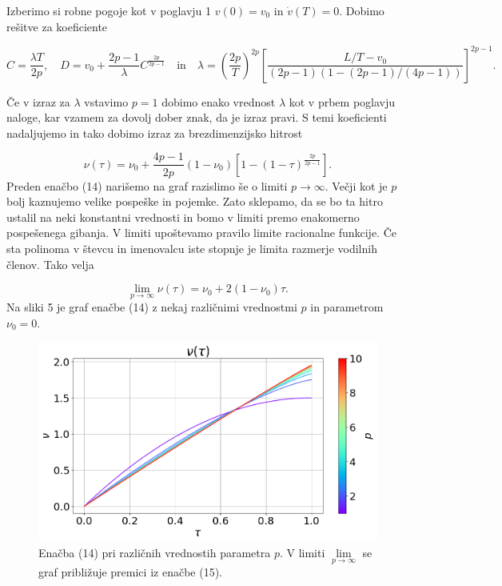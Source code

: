 \documentclass[slovene,11pt,a4paper]{article}
\begin{document}
Izberimo si robne pogoje kot v poglavju 1 $v(0) = v_0$ in $\dot{v}(T) = 0$. Dobimo rešitve za koeficiente

\[
C = \frac{\lambda T}{2p}, \quad
D = v_0 + \frac{2p-1}{\lambda} C^{\frac{2p}{2p-1}} \quad \text{in} \quad
\lambda = \left( \frac{2p}{T} \right)^{2p} \left[\frac{L/T - v_0}{(2p-1) (1-(2p-1)/(4p-1))}\right]^{2p-1}.
\]

Če v izraz za $\lambda$ vstavimo $p=1$ dobimo enako vrednost $\lambda$ kot v prbem poglavju naloge, kar vzamem za dovolj dober znak, da je izraz pravi. S temi koeficienti nadaljujemo in tako dobimo izraz za brezdimenzijsko hitrost

\begin{equation}
\nu(\tau) = \nu_0 + \frac{4p-1}{2p}(1-\nu_0)\left[1-(1-\tau)^{\frac{2p}{2p-1}}\right].
\end{equation}
Preden enačbo (14) narišemo na graf razislimo še o limiti $p\rightarrow \infty$. Večji kot je $p$ bolj kaznujemo velike pospeške in pojemke. Zato sklepamo, da se bo ta hitro ustalil na neki konstantni vrednosti in bomo v limiti premo enakomerno pospešenega gibanja. V limiti upoštevamo pravilo limite racionalne funkcije. Če sta polinoma v števcu in imenovalcu iste stopnje je limita razmerje vodilnih členov. Tako velja

\begin{equation}
\lim\limits_{p\rightarrow \infty} \nu(\tau) = \nu_0 + 2(1-\nu_0)\tau.
\end{equation}
Na sliki 5 je graf enačbe (14) z nekaj različnimi vrednostmi $p$ in parametrom $\nu_0 = 0$.

\begin{figure}[h!]
\centering
\includegraphics[width=\linewidth]{SodePotence1.png}
\caption{Enačba (14) pri različnih vrednostih parametra $p$. V limiti $\lim\limits_{p\rightarrow \infty}$ se graf približuje premici iz enačbe (15).}
\end{figure}
\end{document}
